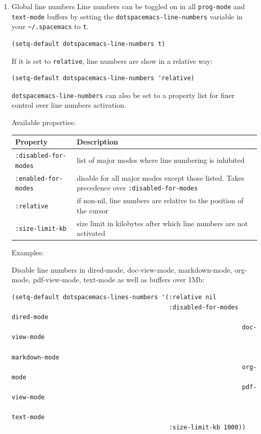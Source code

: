 \documentclass[11pt]{article}
\begin{document}
\begin{enumerate}
\item Global line numbers
\label{sec:orgc5a5a1b}
Line numbers can be toggled on in all \texttt{prog-mode} and \texttt{text-mode} buffers by
setting the \texttt{dotspacemacs-line-numbers} variable in your \texttt{\textasciitilde{}/.spacemacs} to \texttt{t}.

\begin{verbatim}
(setq-default dotspacemacs-line-numbers t)
\end{verbatim}

If it is set to \texttt{relative}, line numbers are show in a relative way:

\begin{verbatim}
(setq-default dotspacemacs-line-numbers 'relative)
\end{verbatim}

\texttt{dotspacemacs-line-numbers} can also be set to a property list for finer control
over line numbers activation.

Available properties:

\begin{center}
\begin{tabular}{ll}
Property & Description\\
\hline
\texttt{:disabled-for-modes} & list of major modes where line numbering is inhibited\\
\texttt{:enabled-for-modes} & disable for all major modes except those listed. Takes precedence over \texttt{:disabled-for-modes}\\
\texttt{:relative} & if non-nil, line numbers are relative to the position of the cursor\\
\texttt{:size-limit-kb} & size limit in kilobytes after which line numbers are not activated\\
\end{tabular}
\end{center}

Examples:

Disable line numbers in dired-mode, doc-view-mode, markdown-mode, org-mode,
pdf-view-mode, text-mode as well as buffers over 1Mb:

\begin{verbatim}
(setq-default dotspacemacs-lines-numbers '(:relative nil
                                           :disabled-for-modes dired-mode
                                                               doc-view-mode
                                                               markdown-mode
                                                               org-mode
                                                               pdf-view-mode
                                                               text-mode
                                           :size-limit-kb 1000))
\end{verbatim}


\end{enumerate}
\end{document}
